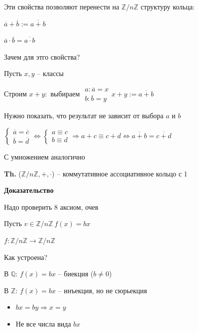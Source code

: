 \documentclass[14pt, letter paper]{article}
\begin{document}
Эти свойства позволяют перенести на $\mathbb{Z}/n\mathbb{Z}$ структуру кольца:

$\overline{a} + \overline{b} := \overline{a + b}$

$\overline{a} \cdot \overline{b} = \overline{a \cdot b}$

Зачем для этго свойства?

Пусть $x, y$ -- классы

Строим $x + y:$ выбираем $\begin{gathered}
    a : \overline{a} = x \\
    b : \overline{b} = y
\end{gathered} x + y := \overline{a + b}$

Нужно показать, что результат не зависит от выбора $a$ и $b$

$\begin{cases}
    \overline{a} = \overline{c} \\
    \overline{b} = \overline{d}
\end{cases} \Leftrightarrow \begin{cases}
    a \equiv c \\
    b \equiv d
\end{cases} \Rightarrow a + c \equiv c + d \Leftrightarrow \overline{a + b} = \overline{c + d}$

С умножением аналогично

\textbf{Th.} ($\mathbb{Z}/n\mathbb{Z}, +, \cdot$) -- коммутативное ассоциативное кольцо с 1

\begin{center}
    \textbf{Доказательство}
\end{center}

Надо проверить 8 аксиом, очев

\vspace{5mm}

Пусть $v \in \mathbb{Z}/n\mathbb{Z}\ f(x) = bx$

$f : \mathbb{Z}/n\mathbb{Z} \rightarrow \mathbb{Z}/n\mathbb{Z}$

Как устроена?

В $\mathbb{Q}$: $f(x) = bx$ -- биекция ($b \neq 0$)

В $\mathbb{Z}$: $f(x) = bx$ -- инъекция, но не сюрьекция

\begin{itemize}
    \item $bx = by \Rightarrow x = y$
    \item Не все числа вида $bx$
\end{itemize}
\end{document}

